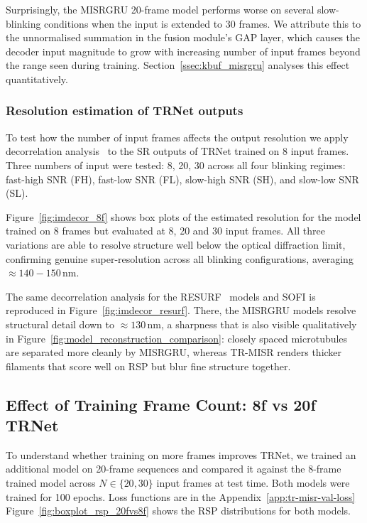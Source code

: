 Surprisingly, the MISRGRU 20-frame model performs worse on
several slow-blinking conditions when the input is extended to 30 frames.
We attribute this to the unnormalised summation in the fusion module's GAP layer, which
causes the decoder input magnitude to grow with increasing number of input frames
beyond the range seen during training.
Section~\ref{ssec:kbuf_misrgru} analyses this effect quantitatively.


\subsubsection{Resolution estimation of TRNet outputs}
To test how the number of input frames affects the output resolution we apply
decorrelation analysis~\cite{descloux2019decorrelation} to the SR outputs of TRNet
trained on 8 input frames.
Three numbers of input were tested: 8, 20, 30 across all four blinking regimes:
fast-high SNR (FH), fast-low SNR (FL), slow-high SNR (SH), and slow-low SNR (SL).

Figure~\ref{fig:imdecor_8f} shows box plots of the estimated resolution for the
model trained on 8 frames but evaluated at 8, 20 and 30 input frames. 
All three variations are able to resolve structure well below the optical diffraction limit,
confirming genuine super-resolution across all blinking configurations, averaging 
${\approx}140-150$\,nm.

The same decorrelation analysis for the RESURF~\cite{resurf2024} models and SOFI is reproduced
in Figure~\ref{fig:imdecor_resurf}. There, the MISRGRU models resolve structural detail down
to ${\approx}130$\,nm, a sharpness that is also visible qualitatively in
Figure~\ref{fig:model_reconstruction_comparison}: closely spaced microtubules are separated
more cleanly by MISRGRU, whereas TR-MISR renders thicker filaments that score well on RSP
but blur fine structure together.



\subsection{Effect of Training Frame Count: 8f vs 20f TRNet}
\label{ssec:trnet_8f_vs_20f}

To understand whether training on more frames improves TRNet, we trained an additional
model on 20-frame sequences and compared it against the 8-frame trained model across
$N \in \{20, 30\}$ input frames at test time. Both models were trained for 100 epochs.
Loss functions are in the Appendix~\ref{app:tr-misr-val-loss}
Figure~\ref{fig:boxplot_rsp_20fvs8f} shows the RSP distributions for both models.


